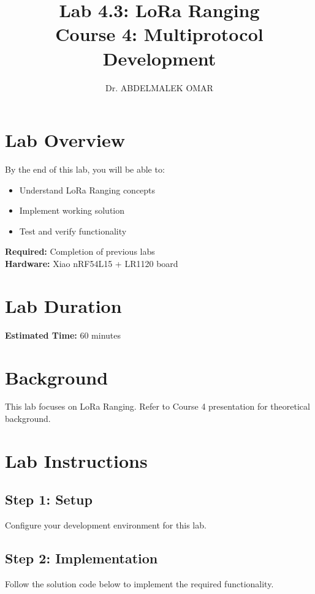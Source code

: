 \documentclass[11pt,a4paper]{article}
\title{\textbf{Lab 4.3: LoRa Ranging}\\
\large Course 4: Multiprotocol Development}
\author{Dr. ABDELMALEK OMAR}
\date{}
\begin{document}
\maketitle
\thispagestyle{fancy}

\section{Lab Overview}

\begin{objectivebox}
By the end of this lab, you will be able to:
\begin{itemize}
    \item Understand LoRa Ranging concepts
    \item Implement working solution
    \item Test and verify functionality
\end{itemize}
\end{objectivebox}

\begin{prereqbox}
\textbf{Required:} Completion of previous labs\\
\textbf{Hardware:} Xiao nRF54L15 + LR1120 board
\end{prereqbox}

\section{Lab Duration}
\textbf{Estimated Time:} 60 minutes

\section{Background}

This lab focuses on LoRa Ranging. Refer to Course 4 presentation for theoretical background.

\section{Lab Instructions}

\subsection{Step 1: Setup}
Configure your development environment for this lab.

\subsection{Step 2: Implementation}
Follow the solution code below to implement the required functionality.
\end{document}
